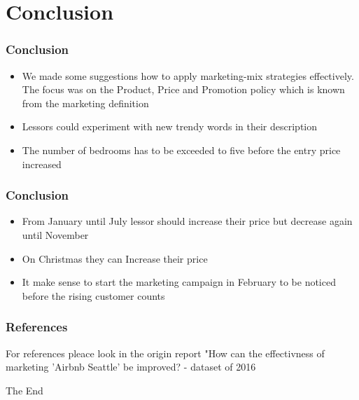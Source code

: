 \documentclass{beamer}
\begin{document}
\section{Conclusion}
\begin{frame}
\frametitle{Conclusion}
\begin{itemize}
\item We made some suggestions how to apply marketing-mix strategies effectively. The focus was on the Product, Price and Promotion policy which is known from the marketing definition
\item Lessors could experiment with new trendy words in their description
\item The number of bedrooms has to be exceeded to five before the entry price increased

\end{itemize}
\end{frame}
\begin{frame}
\frametitle{Conclusion}
\begin{itemize}
\item From January until July lessor should increase their price but decrease again until November
\item On Christmas they can Increase their price
\item It make sense to start the marketing campaign in February to be noticed before the rising customer counts
\end{itemize}
\end{frame}
\begin{frame}
\frametitle{References}
For references pleace look in the origin report "How can the effectivness of marketing 'Airbnb Seattle' be improved? - dataset of 2016 
\end{frame}
\begin{frame}
\Huge{\centerline{The End}}
\end{frame}
\end{document}
